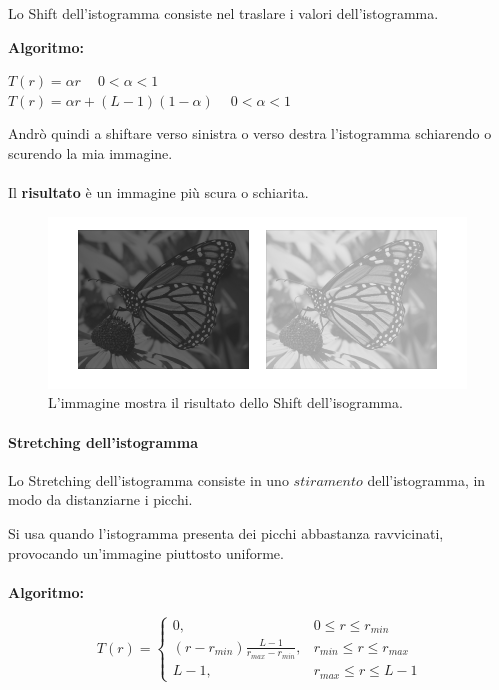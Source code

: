 \begin{definition}
    Lo Shift dell'istogramma consiste nel traslare i valori dell’istogramma.
\end{definition}
\textbf{Algoritmo:}

\begin{center}
    $T(r) = \alpha r$  $ \ \ \ \  0 < \alpha < 1$ \\
    $T(r) = \alpha r + (L-1)(1-\alpha)$ $\ \ \ \ 0<\alpha<1$
\end{center}

Andrò quindi a shiftare verso sinistra o verso destra l'istogramma schiarendo o
scurendo la mia immagine. \\\\
Il \textbf{risultato} è un immagine più scura o schiarita.

\begin{figure}[H]
    \centering
    \includegraphics[width=\linewidth, keepaspectratio]{capitoli/immagini/imgs/shift-isto.png}
    \caption{L'immagine mostra il risultato dello Shift dell'isogramma.}
\end{figure}

\paragraph{Stretching dell'istogramma}

\begin{definition}
    Lo Stretching dell'istogramma consiste in uno $stiramento$ dell'istogramma,
    in modo da distanziarne i picchi.
\end{definition}

Si usa quando l'istogramma presenta dei picchi abbastanza ravvicinati,
provocando un'immagine piuttosto uniforme. \\\\
\textbf{Algoritmo:}

$$
    T(r) =
    \begin{cases}
        0,                                         & 0 \le r \le r_{min}       \\
        (r - r_{min}) \frac{L-1}{r_{max}-r_{min}}, & r_{min} \le r \le r_{max} \\
        L-1,                                       & r_{max} \le r \le L-1
    \end{cases}
$$

